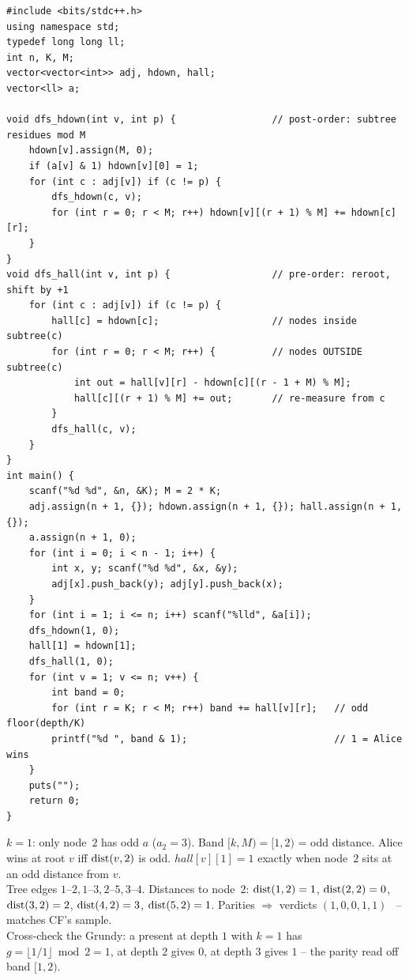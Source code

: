 \begin{lstlisting}[caption={Codeforces 1498F -- reroot a width-2k distance histogram of odd-a nodes; verdict = parity of the [k,2k) band; O(nk), edge-transfer = cyclic shift}, label={lst:c20-summit}]
#include <bits/stdc++.h>
using namespace std;
typedef long long ll;
int n, K, M;
vector<vector<int>> adj, hdown, hall;
vector<ll> a;

void dfs_hdown(int v, int p) {                 // post-order: subtree residues mod M
    hdown[v].assign(M, 0);
    if (a[v] & 1) hdown[v][0] = 1;
    for (int c : adj[v]) if (c != p) {
        dfs_hdown(c, v);
        for (int r = 0; r < M; r++) hdown[v][(r + 1) % M] += hdown[c][r];
    }
}
void dfs_hall(int v, int p) {                  // pre-order: reroot, shift by +1
    for (int c : adj[v]) if (c != p) {
        hall[c] = hdown[c];                    // nodes inside subtree(c)
        for (int r = 0; r < M; r++) {          // nodes OUTSIDE subtree(c)
            int out = hall[v][r] - hdown[c][(r - 1 + M) % M];
            hall[c][(r + 1) % M] += out;       // re-measure from c
        }
        dfs_hall(c, v);
    }
}
int main() {
    scanf("%d %d", &n, &K); M = 2 * K;
    adj.assign(n + 1, {}); hdown.assign(n + 1, {}); hall.assign(n + 1, {});
    a.assign(n + 1, 0);
    for (int i = 0; i < n - 1; i++) {
        int x, y; scanf("%d %d", &x, &y);
        adj[x].push_back(y); adj[y].push_back(x);
    }
    for (int i = 1; i <= n; i++) scanf("%lld", &a[i]);
    dfs_hdown(1, 0);
    hall[1] = hdown[1];
    dfs_hall(1, 0);
    for (int v = 1; v <= n; v++) {
        int band = 0;
        for (int r = K; r < M; r++) band += hall[v][r];   // odd floor(depth/K)
        printf("%d ", band & 1);                          // 1 = Alice wins
    }
    puts("");
    return 0;
}
\end{lstlisting}

\begin{tracebox}[Official sample: $n=5$, $k=1$ ($M=2$), values $(0,3,2,4,4)$ $\Rightarrow$ 1 0 0 1 1]
$k=1$: only node~$2$ has odd $a$ ($a_2=3$). Band $[k,M)=[1,2)$ = odd distance. Alice
wins at root $v$ iff $\operatorname{dist}(v,2)$ is odd. $\mathit{hall}[v][1]=1$ exactly when
node~$2$ sits at an odd distance from $v$.\\
Tree edges $1\text{--}2,1\text{--}3,2\text{--}5,3\text{--}4$.
Distances to node~$2$: $\operatorname{dist}(1,2)=1$, $\operatorname{dist}(2,2)=0$, $\operatorname{dist}(3,2)=2$,
$\operatorname{dist}(4,2)=3$, $\operatorname{dist}(5,2)=1$. Parities $\Rightarrow$ verdicts
$(1,0,0,1,1)$ \checkmark\ -- matches CF's sample.\\
Cross-check the Grundy: a present at depth $1$ with $k=1$ has $g=\lfloor 1/1\rfloor\bmod2=1$,
at depth $2$ gives $0$, at depth $3$ gives $1$ -- the parity read off band $[1,2)$.
\end{tracebox}

